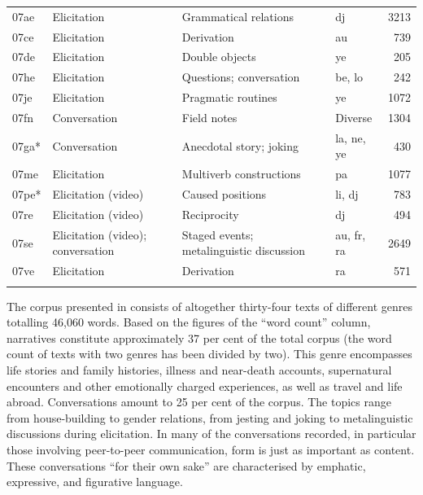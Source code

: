 \begin{longtable}{l >{\raggedright}p{2.1cm} >{\raggedright}p{4.5cm} lr}
07ae & Elicitation & Grammatical relations & dj & 3213\\
07ce & Elicitation & Derivation & au & 739\\
07de & Elicitation & Double objects & ye & 205\\
07he & Elicitation & Questions; conversation & be, lo & 242\\
07je & Elicitation & Pragmatic routines & ye & 1072\\
07fn & Conversation & Field notes & Diverse & 1304\\
07ga* & Conversation & Anecdotal story; joking & la, ne, ye & 430\\
07me & Elicitation & Multiverb constructions & pa & 1077\\
07pe* & Elicitation (video) & Caused positions & li, dj & 783\\
07re & Elicitation (video) & Reciprocity & dj & 494\\
07se & Elicitation (video); conversation & Staged events; metalinguistic discussion & au, fr, ra & 2649\\
07ve & Elicitation & Derivation & ra & 571\\
\lspbottomrule
\end{longtable}
The corpus presented in  consists of altogether thirty-four texts of different genres totalling 46,060 words. Based on the figures of the “word count” column, narratives constitute approximately 37 per cent of the total corpus (the word count of texts with two genres has been divided by two). This genre encompasses life stories and family histories, illness and near-death accounts, supernatural encounters and other emotionally charged experiences, as well as travel and life abroad. Conversations amount to 25 per cent of the corpus. The topics range from house-building to gender relations, from jesting and joking to metalinguistic discussions during elicitation. In many of the conversations recorded, in particular those involving peer-to-peer communication, form is just as important as content. These conversations “for their own sake” are characterised by emphatic, expressive, and figurative language. 


